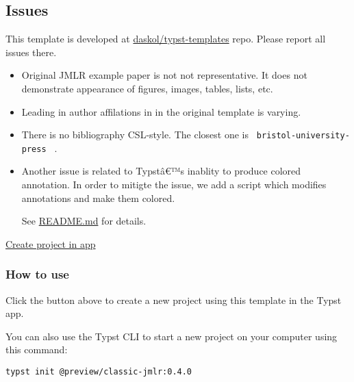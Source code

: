 \subsection{Issues}\label{issues}

This template is developed at
\href{https://github.com/daskol/typst-templates}{daskol/typst-templates}
repo. Please report all issues there.

\begin{itemize}
\item
  Original JMLR example paper is not not representative. It does not
  demonstrate appearance of figures, images, tables, lists, etc.
\item
  Leading in author affilations in in the original template is varying.
\item
  There is no bibliography CSL-style. The closest one is
  \texttt{\ bristol-university-press\ } .
\item
  Another issue is related to Typstâ€™s inablity to produce colored
  annotation. In order to mitigte the issue, we add a script which
  modifies annotations and make them colored.

\begin{Shaded}
\begin{Highlighting}[]
\end{Highlighting}
\end{Shaded}

  See
  \href{https://github.com/daskol/typst-templates/\#colored-annotations}{README.md}
  for details.
\end{itemize}

\href{/app?template=classic-jmlr&version=0.4.0}{Create project in app}

\subsubsection{How to use}\label{how-to-use}

Click the button above to create a new project using this template in
the Typst app.

You can also use the Typst CLI to start a new project on your computer
using this command:

\begin{verbatim}
typst init @preview/classic-jmlr:0.4.0
\end{verbatim}



